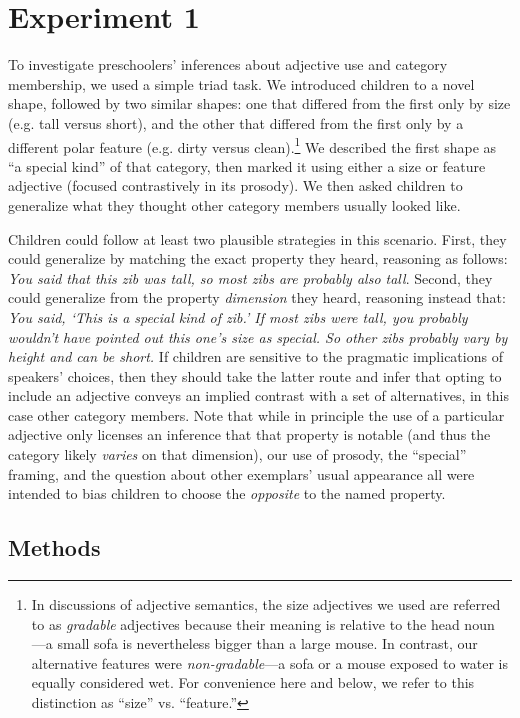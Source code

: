 \documentclass[man]{apa2}
\begin{document}
\section{Experiment 1}

To investigate preschoolers' inferences about adjective use and category membership, we used a simple triad task.  We introduced children to a novel shape, followed by two similar shapes: one that differed from the first only by size (e.g. tall versus short), and the other that differed from the first only by a different polar feature (e.g. dirty versus clean).\footnote{In discussions of adjective semantics, the size adjectives we used are referred to as \emph{gradable} adjectives because their meaning is relative to the head noun \cite{kennedy2012}---a small sofa is nevertheless bigger than a large mouse. In contrast, our alternative features were \emph{non-gradable}---a sofa or a mouse exposed to water is equally considered wet. For convenience here and below, we refer to this distinction as ``size'' vs. ``feature.''} We described the first shape as ``a special kind'' of that category, then marked it using either a size or feature adjective (focused contrastively in its prosody). We then asked children to generalize what they thought other category members usually looked like. 

Children could follow at least two plausible strategies in this scenario. First, they could generalize by matching the exact property they heard, reasoning as follows: \emph{You said that this zib was tall, so most zibs are probably also tall}. Second, they could generalize from the property \emph{dimension} they heard, reasoning instead that: \emph{You said, `This is a special kind of zib.' If most zibs were tall, you probably wouldn't have pointed out this one's size as special. So other zibs probably vary by height and can be short.} If children are sensitive to the pragmatic implications of speakers' choices, then they should take the latter route and infer that opting to include an adjective conveys an implied contrast with a set of alternatives, in this case other category members. Note that while in principle the use of a particular adjective only licenses an inference that that property is notable (and thus the category likely \emph{varies} on that dimension), our use of prosody, the ``special'' framing, and the question about other exemplars' usual appearance all were intended to bias children to choose the \emph{opposite} to the named property.


\subsection{Methods}
\end{document}
